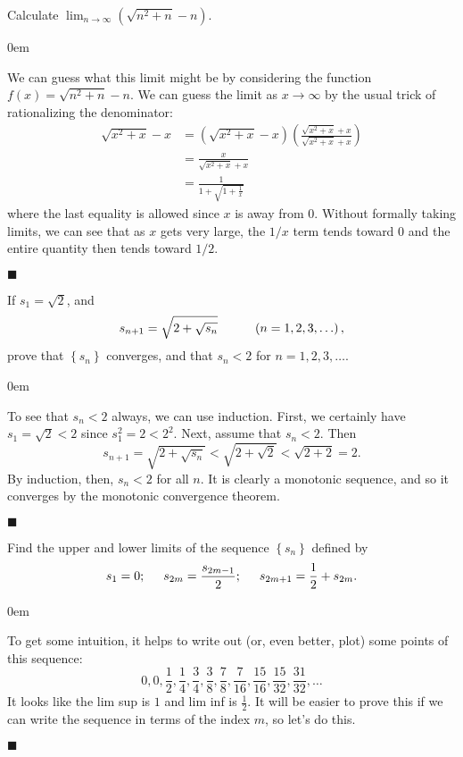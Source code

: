 \documentclass[12pt]{article}
\renewcommand{\qed}{\hfill$\blacksquare$}
\renewenvironment{proof}{\begin{addmargin}[1em]{0em}\begin{newproof}}{\end{newproof}\end{addmargin}\qed}
\newenvironment{problem}[2][Exercise]{\begin{trivlist}
\item[\hskip \labelsep {\bfseries #1}\hskip \labelsep {\bfseries #2.}]}{\end{trivlist}}
\begin{document}
\begin{problem}{3.2}
Calculate $\lim_{n\rightarrow \infty} \left(\sqrt{n^2+n}-n\right)$.
\end{problem}
\begin{proof}
We can guess what this limit might be by considering the function $f\left(x\right) = \sqrt{n^2+n}-n$. We can guess the limit as $x\rightarrow \infty$ by the usual trick of rationalizing the denominator:
\begin{equation*}
\begin{split}
\sqrt{x^2+x}-x & = \left( \sqrt{x^2+x}-x\right)\left( \frac{\sqrt{x^2+x}+x}{\sqrt{x^2+x}+x}\right) \\
& = \frac{x}{\sqrt{x^2+x}+x} \\
& = \frac{1}{1+\sqrt{1+\frac{1}{x} }}
\end{split}
\end{equation*}
where the last equality is allowed since $x$ is away from $0$. Without formally taking limits, we can see that as $x$ gets very large, the $1/x$ term tends toward $0$ and the entire quantity then tends toward $1/2$.
\end{proof}


\begin{problem}{3.3}
If $s_1=\sqrt{2}$, and $$s_{n+1}=\sqrt{2+\sqrt{s_n}} \hspace{10mm} \left(n=1,2,3,\ldots\right), $$ prove that $\left\{s_n\right\}$ converges, and that $s_n < 2$ for $n=1,2,3,\ldots$.
\end{problem}
\begin{proof}

To see that $s_n < 2$ always, we can use induction. First, we certainly have $s_1 = \sqrt{2} < 2$ since $s_1^2 = 2 < 2^2$. Next, assume that $s_n < 2$. Then $$s_{n+1} = \sqrt{2 + \sqrt{s_n}} < \sqrt{2 + \sqrt{2}} < \sqrt{2+2} = 2 .$$ By induction, then, $s_n < 2$ for all $n$. It is clearly a monotonic sequence, and so it converges by the monotonic convergence theorem.
\end{proof}



\begin{problem}{3.4}
Find the upper and lower limits of the sequence $\left\{s_n\right\}$ defined by $$ s_1=0; \hspace{5mm} s_{2m} = \frac{s_{2m-1}}{2}; \hspace{5mm} s_{2m+1} = \frac{1}{2}+s_{2m}.$$
\end{problem}
\begin{proof}
To get some intuition, it helps to write out (or, even better, plot) some points of this sequence: $$ 0, 0, \frac{1}{2}, \frac{1}{4}, \frac{3}{4}, \frac{3}{8}, \frac{7}{8}, \frac{7}{16}, \frac{15}{16}, \frac{15}{32}, \frac{31}{32},\ldots   $$ It looks like the lim sup is $1$ and lim inf is $\frac{1}{2}$. It will be easier to prove this if we can write the sequence in terms of the index $m$, so let's do this. 
\end{proof}
\end{document}
